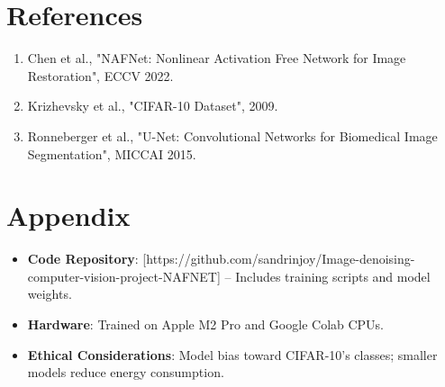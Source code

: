 \documentclass[final]{article}
\begin{document}
\section{References}
\begin{enumerate}
    \item Chen et al., "NAFNet: Nonlinear Activation Free Network for Image Restoration", ECCV 2022.
    \item Krizhevsky et al., "CIFAR-10 Dataset", 2009.
    \item Ronneberger et al., "U-Net: Convolutional Networks for Biomedical Image Segmentation", MICCAI 2015.
\end{enumerate}

\section{Appendix}
\begin{itemize}
    \item \textbf{Code Repository}: [https://github.com/sandrinjoy/Image-denoising-computer-vision-project-NAFNET] – Includes training scripts and model weights.
    \item \textbf{Hardware}: Trained on Apple M2 Pro and Google Colab CPUs.
    \item \textbf{Ethical Considerations}: Model bias toward CIFAR-10’s classes; smaller models reduce energy consumption.
\end{itemize}

{\small


}
\end{document}
